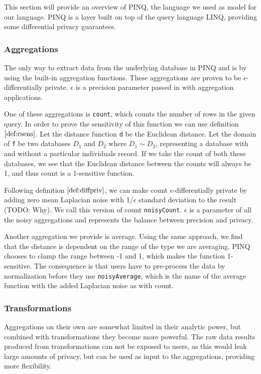 \documentclass[12pt]{article}
\begin{document}
This section will provide an overview of PINQ, the language we used as model for our language. PINQ is a layer built on top of the query language LINQ, providing some differential privacy guarantees.

\subsubsection{Aggregations}

The only way to extract data from the underlying database in PINQ and is by using the built-in aggregation functions. These aggregations are proven to be $\epsilon$-differentially private. $\epsilon$ is a precision parameter passed in with aggregation applications.

One of these aggregations is \texttt{count}, which counts the number of rows in the given query. In order to prove the sensitivity of this function we can use definition $\ref{def:csens}$. 
Let the distance function \texttt{d} be the Euclidean distance. Let the domain of \texttt{f} be two databases $D_1$ and $D_2$ where $D_1 \sim D_2$, representing a database with and without a particular individuals record. If we take the count of both these databases, we see that the Euclidean distance between the counts will always be 1, and thus count is a 1-sensitive function.

Following definition $\ref{def:diffpriv}$, we can make count $\epsilon$-differentially private by adding zero mean Laplacian noise with 1/$\epsilon$ standard deviation to the result (TODO: Why). We call this version of count \texttt{noisyCount}. $\epsilon$ is a parameter of all the noisy aggregations and represents the balance between precision and privacy.

Another aggregation we provide is average. Using the same approach, we find that the distance is dependent on the range of the type we are averaging. PINQ chooses to clamp the range between -1 and 1, which makes the function 1-sensitive. The consequence is that users have to pre-process the data by normalization before they use \texttt{noisyAverage}, which is the name of the average function with the added Laplacian noise as with count.

\subsubsection{Transformations}

Aggregations on their own are somewhat limited in their analytic power, but combined with transformations they become more powerful.
The raw data results produced from transformations can not be exposed to users, as this would leak large amounts of privacy, but can be used as input to the aggregations, providing more flexibility.
\end{document}
